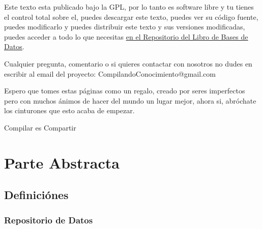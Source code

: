 \documentclass[12pt, fleqn]{report}                             %
\theoremstyle{break}                                            %
\begin{document}
    Este texto esta publicado bajo la GPL, por lo tanto es software libre y tu tienes el control total sobre
    el, puedes descargar este texto, puedes ver su código fuente, puedes modificarlo y puedes distribuir este
    texto y sus versiones modificadas, puedes acceder a todo lo que necesitas 
    \href{http://www.github.com/CompilandoConocimiento/LibroBasesDeDatos}
    {\underline{en el Repositorio del Libro de Bases de Datos}}. 

    Cualquier pregunta, comentario o si quieres contactar con nosotros no dudes en escribir al email del proyecto:
    CompilandoConocimiento@gmail.com

    Espero que tomes estas páginas como un regalo, creado por seres imperfectos pero con muchos ánimos de hacer
    del mundo un lugar mejor, ahora si, abróchate los cinturones que esto acaba de empezar.

    \begin{flushright}
        Compilar es Compartir
    \end{flushright}


\part{Parte Abstracta}
\clearpage


    \chapter{Definiciónes}

        \clearpage
        \section{Repositorio de Datos}
            
\end{document}
